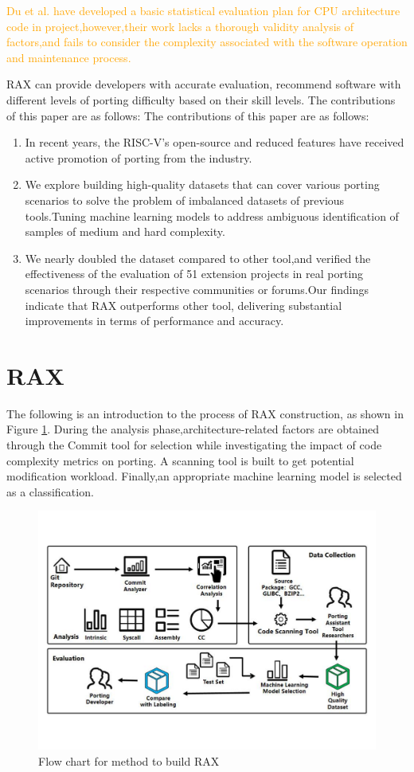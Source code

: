 \documentclass[sigconf,screen,review,anonymous]{acmart}
\begin{document}
\textcolor{orange}{Du et al. have developed a basic statistical evaluation plan for CPU architecture code in project\citep{2023du},however,their work lacks a thorough validity analysis of factors,and fails to consider the complexity associated with the software operation and maintenance process.}
 

RAX can provide developers with accurate evaluation, recommend software with different levels of porting difficulty based on their skill levels. The contributions of this paper are as follows:
The contributions of this paper are as follows:
\begin{enumerate}
  \item In recent years, the RISC-V’s open-source and reduced features have received active promotion of porting from the industry.
  \item We explore building high-quality datasets that can cover various porting scenarios to solve the problem of imbalanced datasets of previous tools.Tuning machine learning models to address ambiguous identification of samples of medium and hard complexity.
  \item We nearly doubled the dataset compared to other tool,and verified the effectiveness of the evaluation of 51 extension projects in real porting scenarios through their respective communities or forums.Our findings indicate that RAX outperforms other tool, delivering substantial improvements in terms of performance and accuracy.
\end{enumerate}


\section{RAX}
The following is an introduction to the process of RAX construction, as shown in Figure \ref{fig:figure1}.
During the analysis phase,architecture-related factors are obtained through the Commit tool for selection while investigating the impact of code complexity metrics on porting.
A scanning tool is built to get potential modification workload.
Finally,an appropriate machine learning model is selected as a classification.
\begin{figure}
  \centering
  \includegraphics[width=\linewidth]{figure1.pdf}
  \caption{Flow chart for method to build RAX}
  \label{fig:figure1}
\end{figure}
\end{document}
